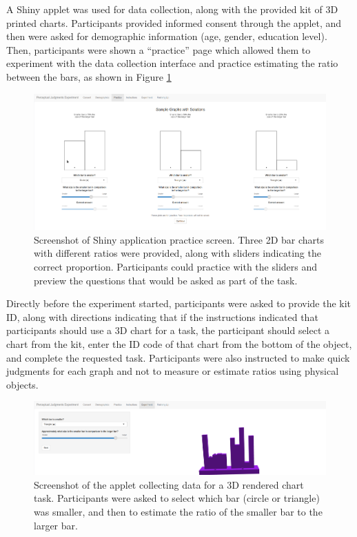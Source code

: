 \documentclass[letterpaper,inpress,dvipsnames]{jdsart}
\begin{document}
A Shiny applet was used for data collection, along with the provided kit of 3D printed charts.
Participants provided informed consent through the applet, and then were asked for demographic information (age, gender, education level).
Then, participants were shown a ``practice'' page which allowed them to experiment with the data collection interface and practice estimating the ratio between the bars, as shown in Figure \ref{fig:practice}

\begin{figure}
\includegraphics[width=0.8\linewidth]{03-Practice-2} \caption{Screenshot of Shiny application practice screen. Three 2D bar charts with different ratios were provided, along with sliders indicating the correct proportion. Participants could practice with the sliders and preview the questions that would be asked as part of the task.}\label{fig:practice}
\end{figure}

Directly before the experiment started, participants were asked to provide the kit ID, along with directions indicating that if the instructions indicated that participants should use a 3D chart for a task, the participant should select a chart from the kit, enter the ID code of that chart from the bottom of the object, and complete the requested task.
Participants were also instructed to make quick judgments for each graph and not to measure or estimate ratios using physical objects.

\begin{figure}
\includegraphics[width=0.8\linewidth]{05-Experiment-05-filled-in} \caption{Screenshot of the applet collecting data for a 3D rendered chart task. Participants were asked to select which bar (circle or triangle) was smaller, and then to estimate the ratio of the smaller bar to the larger bar.}\label{fig:experiment3dRender}
\end{figure}
\end{document}
